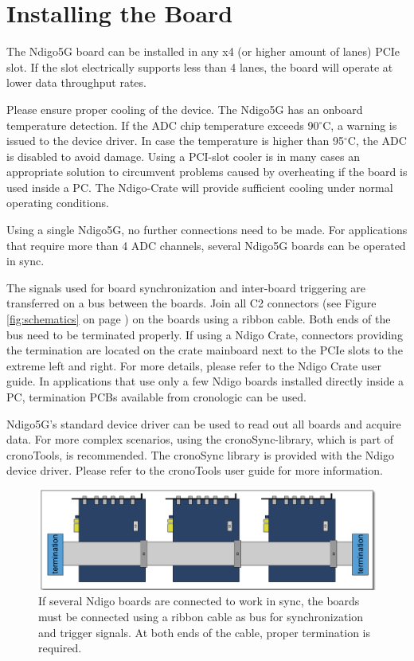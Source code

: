 \section{Installing the Board}
%
The Ndigo5G board can be installed in any x4 (or higher amount of lanes) PCIe slot. If the slot electrically supports less than 4 lanes, the board will operate at lower data throughput rates.\par
Please ensure proper cooling of the device. The Ndigo5G has an onboard temperature detection. If the ADC chip temperature exceeds 90$^{\circ}$C, a warning is issued to the device driver. In case the temperature is higher than 95$^{\circ}$C, the ADC is disabled to avoid damage. Using a PCI-slot cooler is in many cases an appropriate solution to circumvent problems caused by overheating if the board is used inside a PC. The Ndigo-Crate will provide sufficient cooling under normal operating conditions.\par
  
Using a single Ndigo5G, no further connections need to be made. For applications that require more than 4 ADC channels, several Ndigo5G boards can be operated in sync.\par

The signals used for board synchronization and inter-board triggering are transferred on a bus between the boards. Join all C2 connectors (see Figure \ref{fig:schematics} on page \pageref{fig:schematics}) on the boards using a ribbon cable. Both ends of the bus need to be terminated properly. If using a Ndigo Crate, connectors providing the termination are located on the crate mainboard next to the PCIe slots to the extreme left and right. For more details, please refer to the Ndigo Crate user guide. In applications that use only a few Ndigo boards installed directly inside a PC, termination PCBs available from cronologic can be used.\par
Ndigo5G's standard device driver can be used to read out all boards and acquire data. For more complex scenarios, using the cronoSync-library, which is part of cronoTools, is recommended. The cronoSync library is provided with the Ndigo device driver. Please refer to the cronoTools user guide for more information.
%
\begin{figure}[ht]
    \centering
    \includegraphics[width=\textwidth]{figures/Ndigo_Intercon.pdf}
    \caption{If several Ndigo boards are connected to work in sync, the boards must be connected using a ribbon cable as bus for synchronization and trigger signals. At both ends of the cable, proper termination is required.}
\end{figure}
%
%
%
%
%
\clearpage
